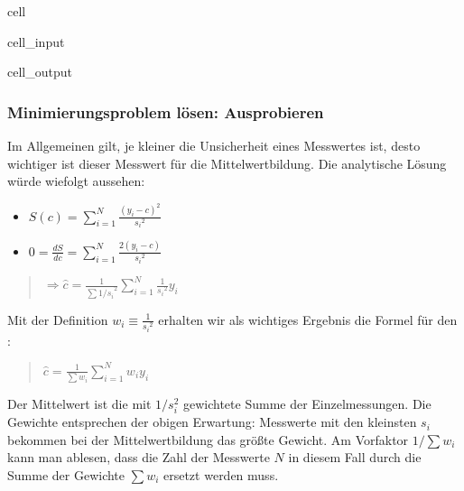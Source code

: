 \documentclass[letterpaper,10pt,english]{jupyterBook}
\begin{document}
\begin{sphinxuseclass}{cell}
\begin{sphinxVerbatimInput}
\begin{sphinxuseclass}{cell_input}
\end{sphinxuseclass}\end{sphinxVerbatimInput}
\begin{sphinxVerbatimOutput}

\begin{sphinxuseclass}{cell_output}
\noindent{}

\end{sphinxuseclass}\end{sphinxVerbatimOutput}

\end{sphinxuseclass}

\subsubsection{Minimierungsproblem lösen: Ausprobieren }
\label{\detokenize{content/1_Kurvenanpassung:minimierungsproblem-losen-ausprobieren-a-id-subsec-ausprobieren-a}}
\sphinxAtStartPar
Im Allgemeinen gilt, je kleiner die Unsicherheit eines Messwertes ist, desto wichtiger ist dieser Messwert für die Mittelwertbildung. Die analytische Lösung würde wiefolgt aussehen:
\begin{itemize}
\item {} 
\sphinxAtStartPar
\(S(c) = \displaystyle\sum_{i=1}^{N} \frac{(y_i -c)^2}{{s_i}^2}\)

\item {} 
\sphinxAtStartPar
\(0= \frac{dS}{dc} = \displaystyle\sum_{i=1}^{N} \frac{2 (y_i -c)}{{s_i}^2}\)

\end{itemize}
\begin{quote}

\sphinxAtStartPar
\(\Rightarrow {\hat c} = \frac{1}{\sum{1/s_i}^2}
     \displaystyle\sum_{i=1}^{N}\frac{1}{{s_i}^2}y_i \)
\end{quote}

\sphinxAtStartPar
Mit der Definition \( w_i \equiv \frac{1} {{s_i}^2}\) erhalten wir als wichtiges
Ergebnis die Formel für den :
\begin{quote}

\sphinxAtStartPar
\({\hat c}= \frac{1} {\sum {w_i}} \displaystyle\sum_{i=1}^{N}  {w_i} y_i\)
\end{quote}

\sphinxAtStartPar
Der Mittelwert ist die mit \(1/s_i^2\) gewichtete Summe der Einzelmessungen.
Die Gewichte entsprechen der obigen Erwartung: Messwerte mit den kleinsten \(s_i\)
bekommen bei der Mittelwertbildung das größte Gewicht. Am Vorfaktor \(1/\sum w_i\) kann
man ablesen, dass die Zahl der Messwerte \(N\) in diesem Fall durch die Summe der Gewichte
\(\sum w_i\) ersetzt werden muss.
\end{document}
